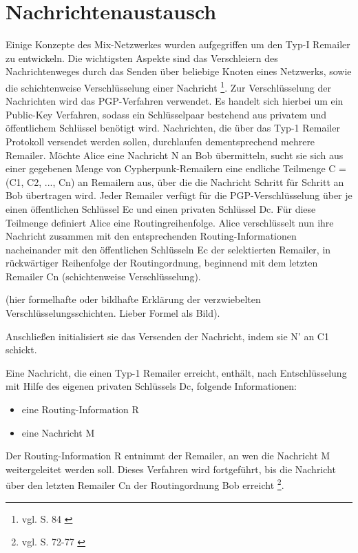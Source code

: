 \section{Nachrichtenaustausch}
Einige Konzepte des Mix-Netzwerkes wurden aufgegriffen um den Typ-I Remailer zu entwickeln. Die wichtigsten Aspekte sind das Verschleiern des Nachrichtenweges durch das Senden über beliebige Knoten eines Netzwerks, sowie die schichtenweise Verschlüsselung einer Nachricht \footnote{vgl. S. 84 \cite{sambleben2013informationstechnologie}}. Zur Verschlüsselung der Nachrichten wird das PGP-Verfahren verwendet. Es handelt sich hierbei um ein Public-Key Verfahren, sodass ein Schlüsselpaar bestehend aus privatem und öffentlichem Schlüssel benötigt wird.
Nachrichten, die über das Typ-1 Remailer Protokoll versendet werden sollen, durchlaufen dementsprechend mehrere Remailer. Möchte Alice eine Nachricht N an Bob übermitteln, sucht sie sich aus einer gegebenen Menge von Cypherpunk-Remailern eine endliche Teilmenge C = (C1, C2, ..., Cn) an Remailern aus, über die die Nachricht Schritt für Schritt an Bob übertragen wird. Jeder Remailer verfügt für die PGP-Verschlüsselung über je einen öffentlichen Schlüssel Ec und einen privaten Schlüssel Dc. Für diese Teilmenge definiert Alice eine Routingreihenfolge.
Alice verschlüsselt nun ihre Nachricht zusammen mit den entsprechenden Routing-Informationen nacheinander mit den öffentlichen Schlüsseln Ec der selektierten Remailer, in rückwärtiger Reihenfolge der Routingordnung, beginnend mit dem letzten Remailer Cn (schichtenweise Verschlüsselung).

(hier formelhafte oder bildhafte Erklärung der verzwiebelten Verschlüsselungsschichten. Lieber Formel als Bild).

Anschließen initialisiert sie das Versenden der Nachricht, indem sie N' an C1 schickt.

Eine Nachricht, die einen Typ-1 Remailer erreicht, enthält, nach Entschlüsselung mit Hilfe des eigenen privaten Schlüssels Dc, folgende Informationen:
\begin{itemize}
\item eine Routing-Information R
\item eine Nachricht M
\end{itemize}

Der Routing-Information R entnimmt der Remailer, an wen die Nachricht M weitergeleitet werden soll. Dieses Verfahren wird fortgeführt, bis die Nachricht über den letzten Remailer Cn der Routingordnung Bob erreicht \footnote{vgl. S. 72-77 \cite{kubieziel2007anonym}}.

